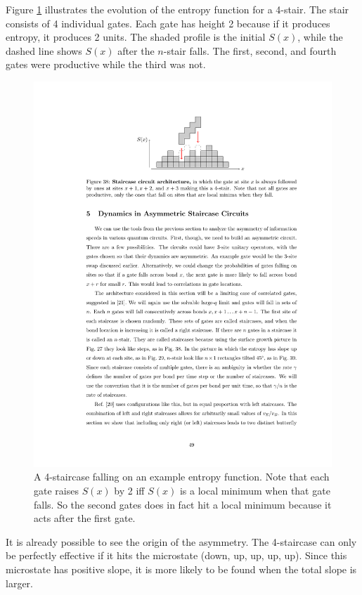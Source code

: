 \documentclass[aps,prx,reprint,superscriptaddress, longbibliography]{revtex4-1}
\begin{document}
Figure \ref{fig:stairs} illustrates the evolution of the entropy function for a 4-stair. The stair consists of 4 individual gates. Each gate has height 2 because if it produces entropy, it produces 2 units. The shaded profile is the initial $S(x)$, while the dashed line shows $S(x)$ after the $n$-stair falls. The first, second, and fourth gates were productive while the third was not.
\begin{figure}
	\includegraphics[width=\columnwidth]{stairs}
	\caption{A 4-staircase falling on an example entropy function. Note that each gate raises $S(x)$ by 2 iff $S(x)$ is a local minimum when that gate falls. So the second gates does in fact hit a local minimum because it acts after the first gate.}
	\label{fig:stairs}
\end{figure}
It is already possible to see the origin of the asymmetry. The 4-staircase can only be perfectly effective if it hits the microstate (down, up, up, up, up). Since this microstate has positive slope, it is more likely to be found when the total slope is larger.
\end{document}
